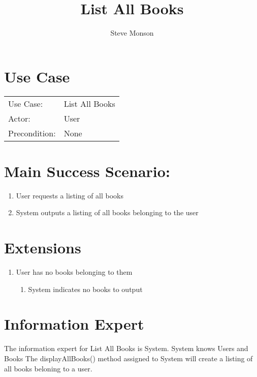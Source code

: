 \documentclass{article}
\title{List All Books}
\author{Steve Monson}
\begin{document}
\maketitle

\section*{Use Case}

\begin{tabular}{l l}
Use Case:     & List All Books \\
Actor:        & User \\
Precondition: & None \\
\end{tabular}

\section*{Main Success Scenario:}

\begin{enumerate}
    \item User requests a listing of all books
    \item System outputs a listing of all books belonging to the user
\end{enumerate}

\section*{Extensions}

\begin{enumerate}
    \item User has no books belonging to them
    \begin{enumerate}
        \item System indicates no books to output
    \end{enumerate}
\end{enumerate}

\section*{Information Expert}

The information expert for List All Books is System.
System knows Users and Books
The displayAllBooks() method assigned to System will create a listing of all books beloning to a user.

\pagebreak
\end{document}
